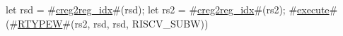 let rsd = #\hyperref[sailRISCVzcreg2regzyidx]{creg2reg\_idx}#(rsd);
let rs2 = #\hyperref[sailRISCVzcreg2regzyidx]{creg2reg\_idx}#(rs2);
#\hyperref[sailRISCVzexecute]{execute}#(#\hyperref[sailRISCVzRTYPEW]{RTYPEW}#(rs2, rsd, rsd, RISCV_SUBW))
